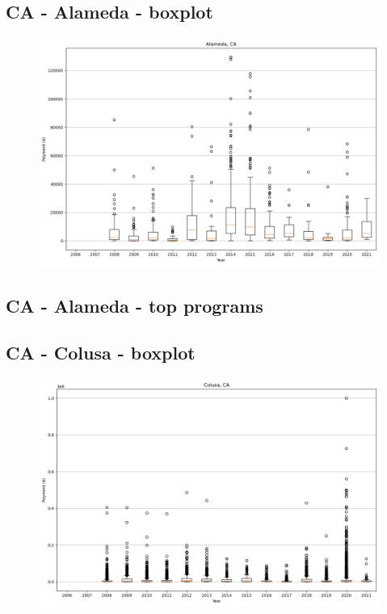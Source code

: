 \subsection*{CA - Alameda - boxplot}
\begin{figure}[h]
\centering
\includegraphics[width=7in]{../output/boxplots/counties/Alameda-CA_boxplot.png}
\end{figure}


\subsection*{CA - Alameda - top programs}

\newpage
\subsection*{CA - Colusa - boxplot}
\begin{figure}[h]
\centering
\includegraphics[width=7in]{../output/boxplots/counties/Colusa-CA_boxplot.png}
\end{figure}


